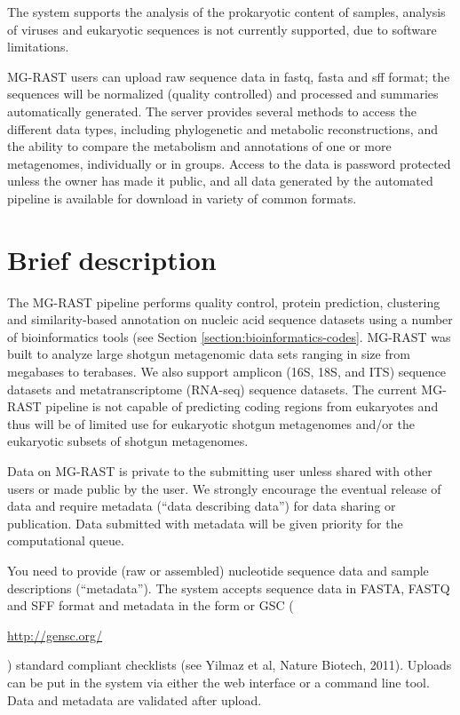 \documentclass[12pt,fullpage]{report}
\begin{document}
The system supports the analysis of the prokaryotic content of samples, analysis of viruses and eukaryotic sequences is not currently supported, due to software limitations.

MG-RAST users can upload raw sequence data in fastq, fasta and sff format; the sequences will be normalized (quality controlled) and processed and summaries automatically generated. The server provides several methods to access the different data types, including phylogenetic and metabolic reconstructions, and the ability to compare the metabolism and annotations of one or more metagenomes, individually or in groups. Access to the data is password protected unless the owner has made it public, and all data generated by the automated pipeline is available for download in variety of common formats.
\section{Brief description}
\label{section:brief-description}
The MG-RAST pipeline performs quality control, protein prediction, clustering and similarity-based annotation on nucleic acid sequence datasets using a number of bioinformatics tools (see Section \ref{section:bioinformatics-codes}.  MG-RAST was built to analyze large shotgun metagenomic data sets ranging in size from megabases to terabases.  We also support amplicon (16S, 18S, and ITS) sequence datasets and metatranscriptome (RNA-seq) sequence datasets.   The current MG-RAST pipeline is not capable of predicting coding regions from eukaryotes and thus will be of limited use for eukaryotic shotgun metagenomes and/or the eukaryotic subsets of shotgun metagenomes.

Data on MG-RAST is private to the submitting user unless shared with other users or made public by the user. We strongly encourage the eventual release of data and require metadata (``data describing data'') for data sharing or publication. Data submitted with metadata will be given priority for the computational queue.

You need to provide (raw or assembled) nucleotide sequence data and sample descriptions (``metadata''). The system accepts sequence data in FASTA, FASTQ and SFF format and metadata in the form or GSC (\begin{small}\url{http://gensc.org/}\end{small}) standard compliant checklists (see Yilmaz et al, Nature Biotech, 2011).   Uploads can be put in the system via either the web interface or a command line tool.   Data and metadata are validated after upload.
\end{document}
